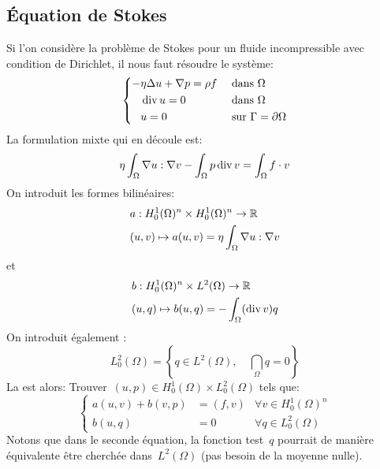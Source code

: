\subsection{Équation de Stokes}
Si l'on considère la problème de Stokes pour un fluide incompressible avec condition de Dirichlet, il
nous faut résoudre le système:
\begin{equation}\left\{
\begin{aligned}
-&\eta \Delta u + \nabla p = \rho f && \text{ dans } \Omega\\
&\operatorname{div} u = 0&& \text{ dans } \Omega\\
&u =0&& \text{ sur } \Gamma=\partial\Omega
\end{aligned}\right.
\end{equation}
La formulation mixte qui en découle est:
\begin{equation}
\eta\dint_\Omega \nabla u: \nabla v %
- \dint_\Omega p \dive v %
= \dint_\Omega f\cdot v %
\end{equation}
On introduit les formes bilinéaires:
\begin{equation}
\begin{aligned}
&a: H^1_0(\Omega)^n\times H^1_0(\Omega)^n \rightarrow \mathbb R \\
&(u,v) \mapsto a(u,v)=\eta\displaystyle\int_\Omega \nabla u: \nabla v
\end{aligned}
\end{equation}
et
\begin{equation}
\begin{aligned}
&b: H^1_0(\Omega)^n\times L^2(\Omega) \rightarrow \mathbb R\\
&(u,q) \mapsto b(u,q)=-\displaystyle\int_\Omega (\operatorname{div} v) q
\end{aligned}
\end{equation}
\medskip
On introduit également :
\begin{equation}L^2_0(\Omega)=\left\{ q\in L^2(\Omega),\quad \dint_\Omega q %
= 0\right\}\end{equation}
\medskip
La  est alors:
Trouver~$(u,p)\in H^1_0(\Omega)\times L^2_0(\Omega)$ tels que:
\begin{equation}\left\{
\begin{array}{rll}
a(u,v)+b(v,p) &= (f,v) & \forall v\in H^1_0(\Omega)^n \\
b(u,q) &=0 &\forall q \in L^2_0(\Omega)
\end{array}\right.
\end{equation}
Notons que dans le seconde équation, la fonction test~$q$ pourrait de manière équivalente
être cherchée dans~$L^2(\Omega)$ (pas besoin de la moyenne nulle).

